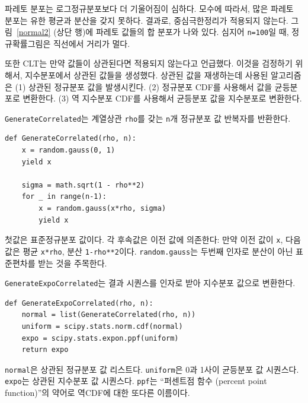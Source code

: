 파레토 분포는 로그정규분포보다 더 기울어짐이 심하다. 모수에 따라서, 많은 파레토 분포는 유한 평균과 분산을 갖지 못하다. 결과로, 중심극한정리가 적용되지 않는다. 그림~\ref{normal2} (상단 행)에 파레토 값들의 합 분포가 나와 있다. 심지어 {\tt n=100}일 때, 정규확률그림은 직선에서 거리가 멀다.

또한 CLT는 만약 값들이 상관된다면 적용되지 않는다고 언급했다. 이것을 검정하기 위해서, 지수분포에서 상관된 값들을 생성했다. 
상관된 값을 재생하는데 사용된 알고리즘은 (1) 상관된 정규분포 값을 발생시킨다. (2) 정규분포 CDF를 사용해서 값을 균등분포로 변환한다. (3) 역 지수분포 CDF를 사용해서 균등분포 값을 지수분포로 변환한다.


{\tt GenerateCorrelated}는 계열상관 {\tt rho}를 갖는 {\tt n}개 정규분포 값 반복자를 반환한다.

\begin{verbatim}
def GenerateCorrelated(rho, n):
    x = random.gauss(0, 1)
    yield x

    sigma = math.sqrt(1 - rho**2)
    for _ in range(n-1):
        x = random.gauss(x*rho, sigma)
        yield x
\end{verbatim}

첫값은 표준정규분포 값이다. 각 후속값은 이전 값에 의존한다: 만약 이전 값이 {\tt x}, 다음값은 평균 {\tt x*rho}, 분산 {\tt 1-rho**2}이다. 
{\tt random.gauss}는 두번째 인자로 분산이 아닌 표준편차를 받는 것을 주목한다.

{\tt GenerateExpoCorrelated}는 결과 시퀀스를 인자로 받아 지수분포 값으로 변환한다.

\begin{verbatim}
def GenerateExpoCorrelated(rho, n):
    normal = list(GenerateCorrelated(rho, n))
    uniform = scipy.stats.norm.cdf(normal)
    expo = scipy.stats.expon.ppf(uniform)
    return expo
\end{verbatim}

{\tt normal}은 상관된 정규분포 값 리스트다.
{\tt uniform}은 0과 1사이 균등분포 값 시퀀스다.
{\tt expo}는 상관된 지수분포 값 시퀀스다.
{\tt ppf}는 ``퍼센트점 함수 (percent point function)''의 약어로 역CDF에 대한 또다른 이름이다.

